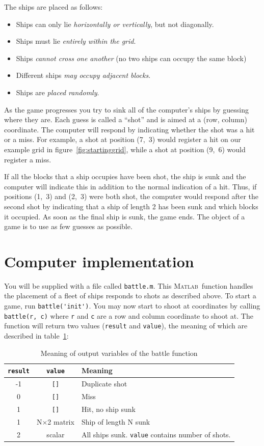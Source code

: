 \documentclass[a4paper, 12pt]{article}
\newcommand\matlab{{\scshape Matlab}}
\begin{document}
The ships are placed as follows:
\begin{itemize}
\item Ships can only lie \emph{horizontally or vertically}, but not diagonally.
\item Ships must lie \emph{entirely within the grid}.
\item Ships \emph{cannot cross one another} (no two ships can occupy the same
  block)
\item Different ships \emph{may occupy adjacent blocks}.
\item Ships are \emph{placed randomly}.
\end{itemize}

As the game progresses you try to sink all of the computer's ships by
guessing where they are.  Each guess is called a ``shot'' and is aimed
at a (row, column) coordinate.  The computer will respond by
indicating whether the shot was a hit or a miss.  For example, a shot
at position (7,~3) would register a hit on our example grid in
figure~\ref{fig:startinggrid}, while a shot at position (9,~6) would
register a miss.  

If all the blocks that a ship occupies have been shot, the ship is
sunk and the computer will indicate this in addition to the normal
indication of a hit.  Thus, if positions (1,~3) and (2,~3) were both
shot, the computer would respond after the second shot by indicating
that a ship of length 2 has been sunk and which blocks it occupied.
As soon as the final ship is sunk, the game ends.  The object of a
game is to use as few guesses as possible.

\section{Computer implementation}
You will be supplied with a file called \verb|battle.m|.  This
\matlab\ function handles the placement of a fleet of ships responds
to shots as described above.  To start a game, run
\verb|battle('init')|.  You may now start to shoot at coordinates by
calling \verb|battle(r, c)| where \verb|r| and \verb|c| are a row and
column coordinate to shoot at.  The function will return two values
(\verb|result| and \verb|value|), the meaning of which are described
in table~\ref{tab:outputvars}:
\begin{table}[htbp]
  \centering
  \caption{Meaning of output variables of the battle function}
  \label{tab:outputvars}
  \begin{tabular}{ccl}
    \toprule
    \verb|result| & \verb|value| & Meaning \\
    \midrule
    -1 & \verb|[]| & Duplicate shot \\
    0 & \verb|[]| & Miss \\
    1 & \verb|[]| & Hit, no ship sunk \\
    1 & N$\times$2 matrix & Ship of length N sunk \\
    2 & scalar & All ships sunk.  \verb|value| contains number of
    shots. \\
    \bottomrule
  \end{tabular}
\end{table}
\end{document}
